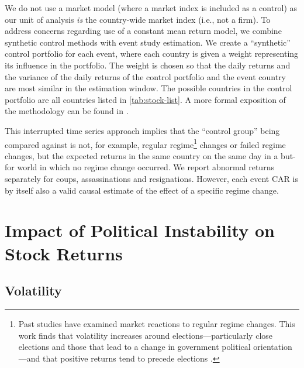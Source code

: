 \documentclass[12pt,final,fleqn]{article}
\theoremstyle{plain}
\begin{document}

We do not use a market model (where a market index is included as a control) as our unit of analysis \textit{is} the country-wide market index (i.e., not a firm). To address concerns regarding use of a constant mean return model, we combine synthetic control methods \citep{abadie2010synthetic} with event study estimation. We create a ``synthetic'' control portfolio for each event, where each country is given a weight representing its influence in the portfolio. The weight is chosen so that the daily returns and the variance of the daily returns of the control portfolio and the event country are most similar in the estimation window. The possible countries in the control portfolio are all countries listed in \autoref{tab:stock-list}. A more formal exposition of the methodology can be found in . 

This interrupted time series approach implies that the ``control group'' being compared against is not, for example, regular regime\footnote{Past studies have examined market reactions to regular regime changes. This work finds that volatility increases around elections---particularly close elections and those that lead to a change in government political orientation \citep{bialkowski2008stock} ---and that positive returns tend to precede elections \citep{pantzalis2000political}.} changes or failed regime changes, but the expected returns in the same country on the same day in a but-for world in which no regime change occurred. We report abnormal returns separately for coups, assassinations and resignations. However, each event CAR is by itself also a valid causal estimate of the effect of a specific regime change. 



\section{Impact of Political Instability on Stock Returns} \label{sec: Impact of Political Instability on Stock Returns}

\subsection{Volatility} \label{subsec: volatility}
\end{document}
